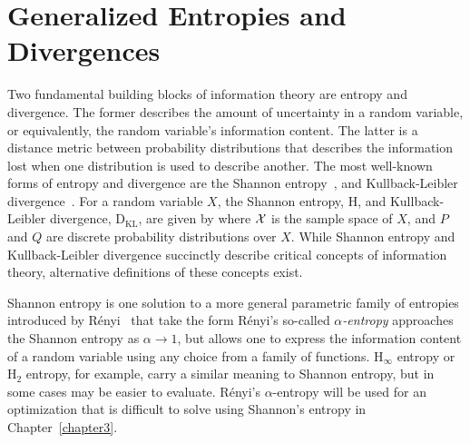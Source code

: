 \section{Generalized Entropies and Divergences}
\label{sec:entropy_and_divergence}

Two fundamental building blocks of information theory are entropy and
divergence. The former describes the amount of uncertainty in a random variable,
or equivalently, the random variable's information content. The latter is a
distance metric between probability distributions that describes the
information lost when one distribution is used to describe another.
The most well-known forms of entropy and divergence are the Shannon
entropy~\cite{shannon1948mathematical}, and
Kullback-Leibler divergence~\cite{kullback1951information}. For a random variable
$X$, the Shannon entropy, $\text{H}$, and Kullback-Leibler divergence,
$\text{D}_{\text{KL}}$, are given by
%
%
where $\mathcal{X}$ is the sample space of $X$, and $P$ and $Q$ are discrete probability
distributions over $X$. While Shannon entropy and Kullback-Leibler divergence
succinctly describe critical concepts of information theory, alternative definitions of
these concepts exist.

Shannon entropy is one solution to a more general parametric family of
entropies introduced by R\'{e}nyi~\cite{renyi1961measures} that take the
form
%
%
R\'{e}nyi's so-called \textit{$\alpha$-entropy} approaches the Shannon entropy as $\alpha
\rightarrow 1$, but allows one to express the information content of a
random variable using any choice from a family of functions. $\text{H}_{\infty}$
entropy or $\text{H}_{2}$ entropy, for example, carry a similar meaning to
Shannon entropy, but in some cases may be easier to evaluate.
R\'{e}nyi's $\alpha$-entropy will be
used for an optimization that is difficult to solve using Shannon's entropy in
Chapter~\ref{chapter3}.

